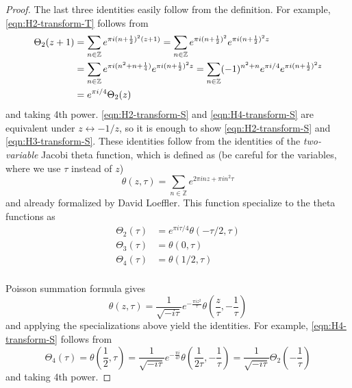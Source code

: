 \begin{proof}\leanok
The last three identities easily follow from the definition.
For example, \eqref{eqn:H2-transform-T} follows from
\begin{align}
    \Theta_{2}(z + 1) &= \sum_{n\in\mathbb{Z}}e^{\pi i (n+\frac12)^2 (z + 1)}
    = \sum_{n \in \mathbb{Z}} e^{\pi i (n + \frac{1}{2})^{2}} e^{\pi i (n + \frac{1}{2})^{2} z} \\
    &= \sum_{n \in \mathbb{Z}} e^{\pi i (n^2 + n + \frac{1}{4})} e^{\pi i (n + \frac{1}{2})^{2} z} = \sum_{n \in \mathbb{Z}} (-1)^{n^2 + n}e^{\pi i / 4} e^{\pi i (n + \frac{1}{2})^{2} z} \\
    &= e^{\pi i / 4} \Theta_{2}(z)
\end{align}
and taking 4th power.
\eqref{eqn:H2-transform-S} and \eqref{eqn:H4-transform-S} are equivalent under $z \leftrightarrow -1/z$, so it is enough to show \eqref{eqn:H2-transform-S} and \eqref{eqn:H3-transform-S}.
These identities follow from the identities of the \emph{two-variable} Jacobi theta function, which is defined as (be careful for the variables, where we use $\tau$ instead of $z$)
\begin{equation}
    \theta(z, \tau) = \sum_{n \in \mathbb{Z}} e^{2 \pi i n z + \pi i n^2 \tau} \label{eqn:jacobi2}
\end{equation}
and already formalized by David Loeffler.
This function specialize to the theta functions as
\begin{align}
    \Theta_{2}(\tau) &= e^{\pi i \tau / 4} \theta(-\tau / 2, \tau) \label{eqn:Th2-as-jacobi2} \\
    \Theta_{3}(\tau) &= \theta(0, \tau) \label{eqn:Th3-as-jacobi2} \\
    \Theta_{4}(\tau) &= \theta(1/2, \tau) \label{eqn:Th4-as-jacobi2} \\
\end{align}

Poisson summation formula gives
\begin{equation}
    \theta(z, \tau) = \frac{1}{\sqrt{-i \tau}} e^{-\frac{\pi i z^2}{\tau}} \theta\left(\frac{z}{\tau}, -\frac{1}{\tau}\right) \label{eqn:jacobi2transform}
\end{equation}
and applying the specializations above yield the identities.
For example, \eqref{eqn:H4-transform-S} follows from
\begin{equation}
    \Theta_{4}(\tau) = \theta\left(\frac{1}{2}, \tau\right) = \frac{1}{\sqrt{-i\tau}} e^{- \frac{\pi i }{4 \tau}} \theta\left(\frac{1}{2 \tau}, -\frac{1}{\tau}\right) = \frac{1}{\sqrt{-i\tau}} \Theta_{2}\left(-\frac{1}{\tau}\right)
\end{equation}
and taking 4th power.
\end{proof}

